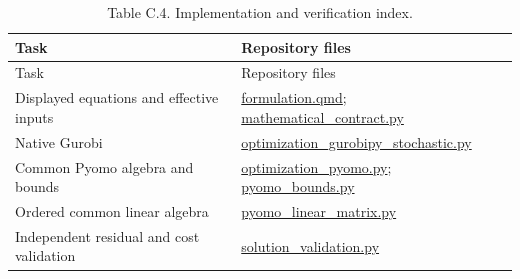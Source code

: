 \documentclass[
  english,
  11pt,
  a4paper,
]{article}
\begin{document}
\begin{longtable}[]{@{}
  >{\raggedright\arraybackslash}p{}
  >{\raggedright\arraybackslash}p{}@{}}
\caption{Table C.4. Implementation and verification
index.}\tabularnewline
\toprule\noalign{}
\begin{minipage}[b]{\linewidth}\raggedright
Task
\end{minipage} & \begin{minipage}[b]{\linewidth}\raggedright
Repository files
\end{minipage} \\
\midrule\noalign{}
\endfirsthead
\toprule\noalign{}
\begin{minipage}[b]{\linewidth}\raggedright
Task
\end{minipage} & \begin{minipage}[b]{\linewidth}\raggedright
Repository files
\end{minipage} \\
\midrule\noalign{}
\endhead
\bottomrule\noalign{}
\endlastfoot
Displayed equations and effective inputs &
\href{https://github.com/unb-lamfo-or-ai-hpc/model-agrologistic/blob/c80dca69c247753d49f06925ec712fcd43bb5a56/manuscript/formulation.qmd}{formulation.qmd};
\href{https://github.com/unb-lamfo-or-ai-hpc/model-agrologistic/blob/c80dca69c247753d49f06925ec712fcd43bb5a56/src/logic/mathematical_contract.py}{mathematical\_contract.py} \\
Native Gurobi &
\href{https://github.com/unb-lamfo-or-ai-hpc/model-agrologistic/blob/c80dca69c247753d49f06925ec712fcd43bb5a56/src/logic/optimization_gurobipy_stochastic.py}{optimization\_gurobipy\_stochastic.py} \\
Common Pyomo algebra and bounds &
\href{https://github.com/unb-lamfo-or-ai-hpc/model-agrologistic/blob/c80dca69c247753d49f06925ec712fcd43bb5a56/src/logic/optimization_pyomo.py}{optimization\_pyomo.py};
\href{https://github.com/unb-lamfo-or-ai-hpc/model-agrologistic/blob/c80dca69c247753d49f06925ec712fcd43bb5a56/src/logic/pyomo_bounds.py}{pyomo\_bounds.py} \\
Ordered common linear algebra &
\href{https://github.com/unb-lamfo-or-ai-hpc/model-agrologistic/blob/c80dca69c247753d49f06925ec712fcd43bb5a56/src/logic/pyomo_linear_matrix.py}{pyomo\_linear\_matrix.py} \\
Independent residual and cost validation &
\href{https://github.com/unb-lamfo-or-ai-hpc/model-agrologistic/blob/c80dca69c247753d49f06925ec712fcd43bb5a56/src/logic/solution_validation.py}{solution\_validation.py} \\

\end{longtable}
\end{document}
